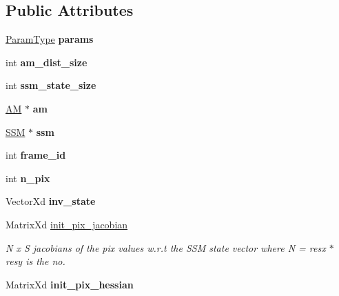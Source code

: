 \subsection*{Public Attributes}
\begin{DoxyCompactItemize}
\item 
\hypertarget{classDiagnostics_a1200b9152d409c31a3cf7b7330284d8e}{\hyperlink{structDiagnosticsParams}{Param\-Type} {\bfseries params}}\label{classDiagnostics_a1200b9152d409c31a3cf7b7330284d8e}

\item 
\hypertarget{classDiagnostics_a2a435594e85958655964372f3e740133}{int {\bfseries am\-\_\-dist\-\_\-size}}\label{classDiagnostics_a2a435594e85958655964372f3e740133}

\item 
\hypertarget{classDiagnostics_a97200fc956e8e95b33998a49e28d9fc4}{int {\bfseries ssm\-\_\-state\-\_\-size}}\label{classDiagnostics_a97200fc956e8e95b33998a49e28d9fc4}

\item 
\hypertarget{classDiagnostics_a3f234df63a32fa05e3104625db896619}{\hyperlink{classAppearanceModel}{A\-M} $\ast$ {\bfseries am}}\label{classDiagnostics_a3f234df63a32fa05e3104625db896619}

\item 
\hypertarget{classDiagnostics_a0a8a0aedaf934678e11fa7e13ece6268}{\hyperlink{classStateSpaceModel}{S\-S\-M} $\ast$ {\bfseries ssm}}\label{classDiagnostics_a0a8a0aedaf934678e11fa7e13ece6268}

\item 
\hypertarget{classDiagnostics_aae4dcb5c6976107eb93db5b70700ad4c}{int {\bfseries frame\-\_\-id}}\label{classDiagnostics_aae4dcb5c6976107eb93db5b70700ad4c}

\item 
\hypertarget{classDiagnostics_a9290ee9650cc84ac5724bd1bb6dbca3c}{int {\bfseries n\-\_\-pix}}\label{classDiagnostics_a9290ee9650cc84ac5724bd1bb6dbca3c}

\item 
\hypertarget{classDiagnostics_ae8f2058e10d18570654bfb62d2ce4bfe}{Vector\-Xd {\bfseries inv\-\_\-state}}\label{classDiagnostics_ae8f2058e10d18570654bfb62d2ce4bfe}

\item 
Matrix\-Xd \hyperlink{classDiagnostics_a1a89abf10430a264cd699d0f4f199fd2}{init\-\_\-pix\-\_\-jacobian}
\begin{DoxyCompactList}\small\item\em N x S jacobians of the pix values w.\-r.\-t the S\-S\-M state vector where N = resx $\ast$ resy is the no. \end{DoxyCompactList}\item 
\hypertarget{classDiagnostics_a006cbd7a6a2d3cd1dc1fc071dbfe1c8d}{Matrix\-Xd {\bfseries init\-\_\-pix\-\_\-hessian}}\label{classDiagnostics_a006cbd7a6a2d3cd1dc1fc071dbfe1c8d}


\end{DoxyCompactItemize}
